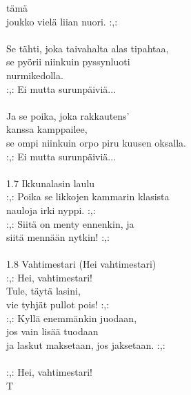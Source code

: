 tämä  \\ joukko vielä liian nuori. :,: \\ \hspace{10mm} \\ Se tähti, joka taivahalta alas tipahtaa, \\ se pyörii niinkuin pyssynluoti  \\ nurmikedolla. \\ :,: Ei mutta surunpäiviä... \\ \hspace{10mm} \\ Ja se poika, joka rakkautens'  \\ kanssa kamppailee, \\ se ompi niinkuin orpo piru kuusen oksalla. \\ :,: Ei mutta surunpäiviä... \\ \hspace{10mm} \\ 1.7 Ikkunalasin laulu \\ :,: Poika se likkojen kammarin klasista  \\ nauloja irki nyppi. :,: \\ :,: Siitä on menty ennenkin, ja  \\ siitä mennään nytkin! :,: \\ \hspace{10mm} \\ 1.8 Vahtimestari (Hei vahtimestari) \\ :,: Hei, vahtimestari! \\ Tule, täytä lasini, \\ vie tyhjät pullot pois! :,: \\ :,: Kyllä enemmänkin juodaan, \\ jos vain lisää tuodaan \\ ja laskut maksetaan, jos jaksetaan. :,: \\ \hspace{10mm} \\ :,: Hei, vahtimestari! \\ T